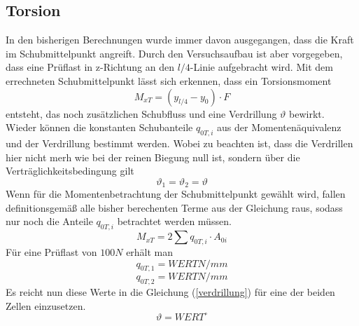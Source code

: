 \subsection{Torsion}
In den bisherigen Berechnungen wurde immer davon ausgegangen, dass die Kraft im Schubmittelpunkt angreift. Durch den Versuchsaufbau ist aber vorgegeben, dass eine Prüflast in z-Richtung an den $l/4$-Linie aufgebracht wird. Mit dem errechneten Schubmittelpunkt lässt sich erkennen, dass ein Torsionsmoment 
\begin{equation}
	M_{xT}=(y_{l/4}-y_{0})\cdot F
\end{equation}
entsteht, das noch zusätzlichen Schubfluss und eine Verdrillung $\vartheta$ bewirkt. Wieder können die konstanten Schubanteile $q_{0T,i}$ aus der Momentenäquivalenz und der Verdrillung bestimmt werden. Wobei zu beachten ist, dass die Verdrillen hier nicht merh wie bei der reinen Biegung null ist, sondern über die Verträglichkeitsbedingung gilt
\begin{equation}
	\vartheta_{1}=\vartheta_{2}=\vartheta
\end{equation}
Wenn für die Momentenbetrachtung der Schubmittelpunkt gewählt wird, fallen definitionsgemäß alle bisher berechenten Terme aus der Gleichung raus, sodass nur noch die Anteile $q_{0T,i}$ betrachtet werden müssen.
\begin{equation}
		M_{xT}=2\sum q_{0T,i}\cdot A_{0i}
\end{equation}
Für eine Prüflast von $100N$ erhält man
\begin{equation}
	q_{0T,1}=WERT N/mm
\end{equation}
\begin{equation}
	q_{0T,2}=WERT N/mm
\end{equation}
Es reicht nun diese Werte in die Gleichung (\ref{verdrillung}) für eine der beiden Zellen einzusetzen.
\begin{equation}
	\vartheta =WERT ^\circ
\end{equation}

